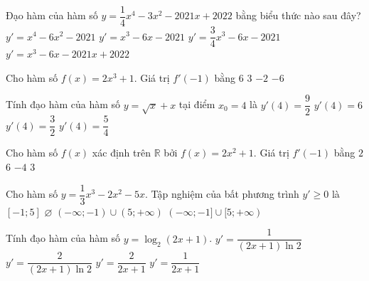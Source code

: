 \begin{ex}%
	 Đạo hàm của hàm số $y=\dfrac{1}{4}x^4-3x^2-2021x+2022$ bằng biểu thức nào sau đây?
	 \choice
		{$y'=x^4-6x^2-2021$} 
		{\True $y'=x^3-6x-2021$} 
		 {$y'=\dfrac{3}{4}x^3-6x-2021$}
		{$y'=x^3-6x-2021x+2022$} 
\end{ex}

\begin{ex}%
	Cho hàm số $f(x)=2x^3+1$. Giá trị  $f'(-1)$ bằng
	 \choice
		{\True $6$} 
		{$3$} 
		 {$-2$}
		{$-6$} 
\end{ex}

\begin{ex}%
	Tính đạo hàm của hàm số $y=\sqrt{x}+x$  tại điểm $x_0=4$ là
	 \choice
		 {$y'(4)=\dfrac{9}{2}$}
		 {$y'(4)=6$}
		{$y'(4)=\dfrac{3}{2}$} 
		{\True $y'(4)=\dfrac{5}{4}$} 
\end{ex}

\begin{ex}%
	Cho  hàm số $f(x)$ xác định trên $\mathbb{R}$ bởi $f(x)=2x^2+1$. Giá trị $f'(-1)$ bằng
	\choice 
		{$2$} 
		{$6$} 
		 {\True $-4$}
		 {$3$}
\end{ex}

\begin{ex}%
	Cho hàm số $y=\dfrac{1}{3}x^3-2x^2-5x$. Tập nghiệm của  bất phương trình $y'\geq 0$ là
	\choice 
		 {$[-1;5]$}
		{$\varnothing$} 
		{$(-\infty;-1)\cup(5;+\infty)$} 
		{\True $(-\infty;-1]\cup[5;+\infty)$} 
	\loigiai{ 
		Ta có $y=\dfrac{1}{3}x^3-2x^2-5x$ nên $y'=x^2-4x-5$. Do  đó,
		\begin{align*}
			y'\geq 0\Leftrightarrow x^2-4x-5\geq  0\Leftrightarrow x\in(-\infty;-1]\cup[5;+\infty).
		\end{align*}
	} 
\end{ex}

\begin{ex}%
	Tính đạo hàm của  hàm số $y=\log_2 \left(2x+1\right)$.
	\choice 
		{$y'=\dfrac{1}{\left(2x+1\right)\ln  2}$}
		{\True $y'=\dfrac{2}{\left(2x+1\right)\ln 2}$} 
		 {$y'=\dfrac{2}{2x+1}$}
		{$y'=\dfrac{1}{2x+1}$} 
\end{ex}

